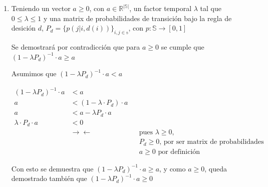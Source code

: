 \documentclass[letterpaper,10pt]{article}
\begin{document}
\begin{enumerate}
\begin{enumerate}
        \item 
            Teniendo un vector $a \geq 0$, con $a \in \mathds{R}^{|\mathds{S}|}$, un factor temporal $\lambda$ tal que $0 \leq \lambda \leq 1$ y una matrix de probabilidades de transición bajo la regla de desición $d$,  $P_d = \{p(j|i, d(i))\}_{i,j \in \mathds{s}}$, con $p : \mathds{S} \rightarrow [0, 1]$
            
            Se demostrará por contradicción que para $a \geq 0$ se cumple que $(1 - \lambda P_d)^{-1} \cdot a \geq a $
            
            Asumimos que $(1 - \lambda P_d)^{-1} \cdot a < a$
            
            \[
            \begin{aligned}
                (1 - \lambda P_d)^{-1} \cdot a &< a \\
                a &< (1 - \lambda \cdot P_d) \cdot a \\
                a &< a - \lambda P_d \cdot a \\
                \lambda \cdot P_d \cdot a &< 0 \\
                &\rightarrow \leftarrow \quad  & &\text{pues } \lambda \geq 0, \\ & & &P_d \geq 0 \text{, por ser matrix de probabilidades y } \\ & & & a \geq 0 \text{ por definición }
            \end{aligned}
            \]
            
            Con esto se demuestra que $(1 - \lambda P_d)^{-1} \cdot a \geq a $, y como $ a \geq 0$, queda demostrado también que $(1 - \lambda P_d)^{-1} \cdot a \geq 0 $
        \end{enumerate}
\end{enumerate}






\section{}
\end{document}
